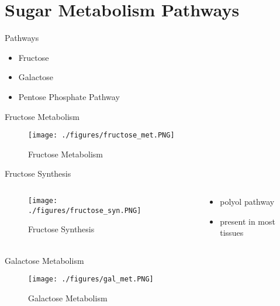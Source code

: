 \documentclass[presentation, smaller]{beamer}
\begin{document}
\section{Sugar Metabolism Pathways}
\label{sec:org0e5527d}
\begin{frame}[label={sec:orgedbc8d4}]{Pathways}
\begin{itemize}
\item Fructose
\item Galactose
\item Pentose Phosphate Pathway
\end{itemize}
\end{frame}
\begin{frame}[label={sec:org11b1c15}]{Fructose Metabolism}
\begin{figure}[htbp]
\centering
\texttt{[image: ./figures/fructose\_met.PNG]}
\caption{\label{fig:orgdb48116}
Fructose Metabolism}
\end{figure}
\end{frame}

\begin{frame}[label={sec:org16f347f}]{Fructose Synthesis}
\begin{columns}
\begin{column}{0.5\columnwidth}
\begin{figure}[htbp]
\centering
\texttt{[image: ./figures/fructose\_syn.PNG]}
\caption{\label{fig:org088c3c3}
Fructose Synthesis}
\end{figure}
\end{column}

\begin{column}{0.5\columnwidth}
\begin{itemize}
\item polyol pathway
\item present in most tissues
\end{itemize}
\end{column}
\end{columns}
\end{frame}

\begin{frame}[label={sec:orgf1a3968}]{Galactose Metabolism}
\begin{figure}[htbp]
\centering
\texttt{[image: ./figures/gal\_met.PNG]}
\caption{\label{fig:org2cbd24b}
Galactose Metabolism}
\end{figure}
\end{frame}
\end{document}
